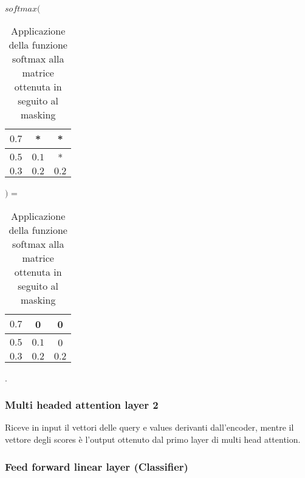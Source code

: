 \begin{itemize}
		\begin{table}[h]                        %
		$softmax($
		\begin{tabular}{r|c|c}                  %
			\hline \hline                           %
			$0.7$ & * & *\\           %
			\hline                                  %
			$0.5$ & $0.1$ & *\\           %
			\hline                                  %
			$0.3$ & $0.2$ & $0.2$\\
			\hline \hline                           %
		\end{tabular}
		$)$
		= 
				\begin{tabular}{r|c|c}                  %
			\hline \hline                           %
			$0.7$ & 0 & 0\\           %
			\hline                                  %
			$0.5$ & $0.1$ & 0\\           %
			\hline                                  %
			$0.3$ & $0.2$ & $0.2$\\
			\hline \hline                           %
		\end{tabular}
		\caption[legenda elenco tabelle]{Applicazione della funzione softmax alla matrice ottenuta in seguito al masking}.
			\end{table}
		\subsubsection{Multi headed attention layer 2}
		Riceve in input il vettori delle query e values derivanti dall'encoder, mentre il vettore degli scores è l'output ottenuto dal primo layer di multi head attention. 
		
		\subsubsection{Feed forward linear layer (Classifier)}
		

\end{itemize}
